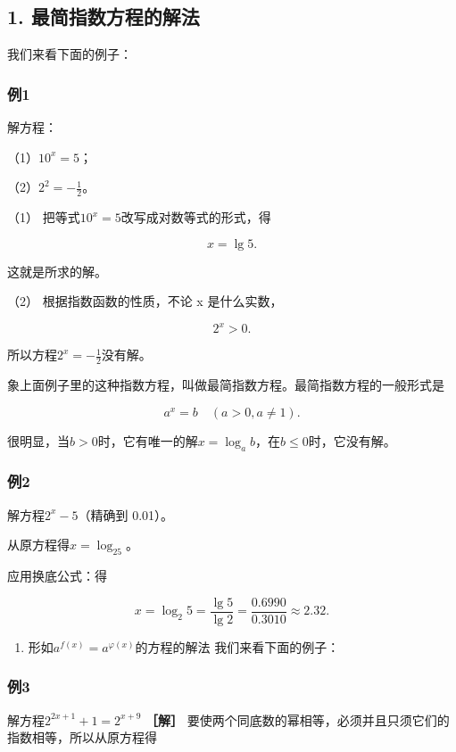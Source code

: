 \subsection{1. 最简指数方程的解法}

我们来看下面的例子：

\subsubsection{例1}

解方程：

（1）\(10^{x} = 5\)；

（2）\(2^{2} = -\frac{1}{2}\)。

 （1） 把等式\(10^{x} = 5\)改写成对数等式的形式，得

\[
x = \lg 5.
\]

这就是所求的解。

（2） 根据指数函数的性质，不论 x 是什么实数，

\[
2^{x} > 0.
\]

所以方程\(2^{x} = -\frac{1}{2}\)没有解。

象上面例子里的这种指数方程，叫做最简指数方程。最简指数方程的一般形式是

\[
a^{x} = b \quad (a > 0, a \neq 1).
\]

很明显，当\(b > 0\)时，它有唯一的解\(x = \log_a b\)，在\(b \leqslant 0\)时，它没有解。

\subsubsection{例2}

解方程\(2^{x}-5\)（精确到 0.01）。

 从原方程得\(x = \log_25\)。

应用换底公式：得

\[
x = \log_{2} 5 = \frac{\lg 5}{\lg 2} = \frac{0.6990}{0.3010} \approx 2.32.
\]

\begin{enumerate}[start=2]
\item
  形如\(a^{f(x)} = a^{\varphi(x)}\)的方程的解法 我们来看下面的例子：
\end{enumerate}

\subsubsection{例3}

解方程\(2^{2x+1}+1=2^{x+9}\) \textbf{［解］}
要使两个同底数的幂相等，必须并且只须它们的指数相等，所以从原方程得

